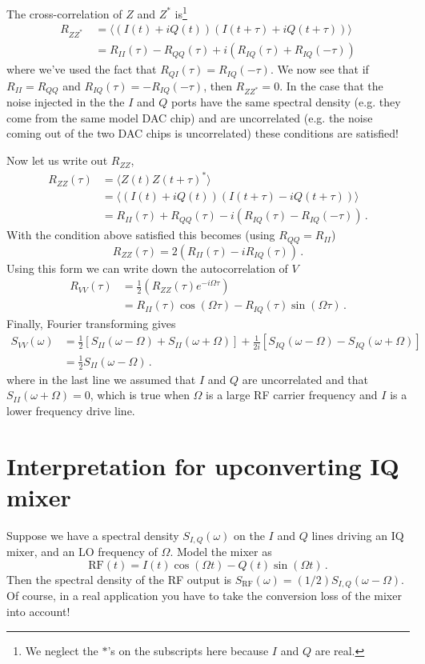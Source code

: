 The cross-correlation of $Z$ and $Z^*$ is\footnote{We neglect the $*$'s on the subscripts here because $I$ and $Q$ are real.}
\begin{align}
R_{ZZ^*}\
&= \langle (I(t) + i Q(t))(I(t+\tau) + i Q(t+\tau)) \rangle \\
&= R_{II}(\tau) - R_{QQ}(\tau) + i \left( R_{IQ}(\tau) + R_{IQ}(-\tau) \right)
\end{align}
where we've used the fact that $R_{QI}(\tau) = R_{IQ}(-\tau)$.
We now see that if $R_{II} = R_{QQ}$ and $R_{IQ}(\tau) = - R_{IQ}(-\tau)$, then $R_{ZZ^*} = 0$.
In the case that the noise injected in the the $I$ and $Q$ ports have the same spectral density (e.g. they come from the same model DAC chip) and are uncorrelated (e.g. the noise coming out of the two DAC chips is uncorrelated) these conditions are satisfied!

Now let us write out $R_{ZZ}$,
\begin{align}
R_{ZZ}(\tau)
&= \langle Z(t) Z(t+\tau)^* \rangle \\
&= \langle (I(t) + i Q(t))(I(t+\tau) - i Q(t+\tau)) \rangle \\
&= R_{II}(\tau) + R_{QQ}(\tau) - i \left( R_{IQ}(\tau) - R_{IQ}(-\tau) \right) \, .
\end{align}
With the condition above satisfied this becomes (using $R_{QQ} = R_{II}$)
\begin{equation}
R_{ZZ}(\tau) = 2 \left( R_{II}(\tau) - i R_{IQ}(\tau) \right) \, .
\end{equation}
Using this form we can write down the autocorrelation of $V$
\begin{align}
R_{VV}(\tau)
&= \frac{1}{2} \left( R_{ZZ}(\tau) e^{-i \Omega \tau} \right) \\
&= R_{II}(\tau) \cos(\Omega \tau) - R_{IQ}(\tau) \sin(\Omega \tau) \, . 
\end{align}
Finally, Fourier transforming gives
\begin{align}
S_{VV}(\omega) &=
\frac{1}{2} \left[ S_{II}(\omega - \Omega) + S_{II}(\omega + \Omega) \right]
+ \frac{1}{2i} \left[ S_{IQ}(\omega - \Omega) - S_{IQ}(\omega + \Omega) \right] \\
&= \frac{1}{2}S_{II}(\omega-\Omega) \, .
\end{align}
where in the last line we assumed that $I$ and $Q$ are uncorrelated and that $S_{II}(\omega + \Omega) = 0$, which is true when $\Omega$ is a large RF carrier frequency and $I$ is a lower frequency drive line.

\section{Interpretation for upconverting IQ mixer}

Suppose we have a spectral density $S_{I,Q}(\omega)$ on the $I$ and $Q$ lines driving an IQ mixer, and an LO frequency of $\Omega$.
Model the mixer as
\begin{equation}
\text{RF}(t) = I(t)\cos(\Omega t) - Q(t)\sin(\Omega t) \, .
\end{equation}
Then the spectral density of the RF output is $S_\text{RF}(\omega) = (1/2) S_{I,Q}(\omega - \Omega)$.
Of course, in a real application you have to take the conversion loss of the mixer into account!

